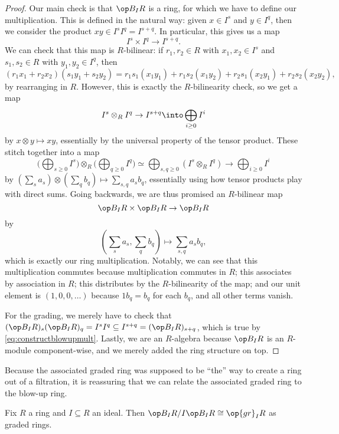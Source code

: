 \begin{proof}
	Our main check is that $\op B_IR$ is a ring, for which we have to define our multiplication. This is defined in the natural way: given $x\in I^s$ and $y\in I^q$, then we consider the product $xy\in I^sI^q=I^{s+q}$. In particular, this gives us a map
	\[I^s\times I^q\to I^{s+q}. \tag{$*$}\label{eq:constructblowupmult}\]
	We can check that this map is $R$-bilinear: if $r_1,r_2\in R$ with $x_1,x_2\in I^s$ and $s_1,s_2\in R$ with $y_1,y_2\in I^q$, then
	\[(r_1x_1+r_2x_2)(s_1y_1+s_2y_2)=r_1s_1(x_1y_1)+r_1s_2(x_1y_2)+r_2s_1(x_2y_1)+r_2s_2(x_2y_2),\]
	by rearranging in $R$. However, this is exactly the $R$-bilinearity check, so we get a map
	\[I^s\otimes_RI^q\to I^{s+q}\into\bigoplus_{i\ge0}I^i\]
	by $x\otimes y\mapsto xy$, essentially by the universal property of the tensor product. These stitch together into a map
	\[\Bigg(\bigoplus_{s\ge0}I^s\Bigg)\otimes_R\Bigg(\bigoplus_{q\ge0}I^q\Bigg)\simeq\bigoplus_{s,q\ge0}\left(I^s\otimes_R I^q\right)\to\bigoplus_{i\ge0}I^i\]
	by $\left(\sum_sa_s\right)\otimes\left(\sum_qb_q\right)\mapsto\sum_{s,q}a_sb_q$, essentially using how tensor products play with direct sums. Going backwards, we are thus promised an $R$-bilinear map
	\[\op B_IR\times\op B_IR\to\op B_IR\]
	by
	\[\left(\sum_sa_s,\sum_qb_q\right)\mapsto\sum_{s,q}a_sb_q,\]
	which is exactly our ring multiplication. Notably, we can see that this multiplication commutes because multiplication commutes in $R$; this associates by association in $R$; this distributes by the $R$-bilinearity of the map; and our unit element is $(1,0,0,\ldots)$ because $1b_q=b_q$ for each $b_q$, and all other terms vanish.

	For the grading, we merely have to check that $(\op B_IR)_s(\op B_IR)_q=I^sI^q\subseteq I^{s+q}=(\op B_IR)_{s+q}$, which is true by \autoref{eq:constructblowupmult}. Lastly, we are an $R$-algebra because $\op B_IR$ is an $R$-module component-wise, and we merely added the ring structure on top.
\end{proof}
Because the associated graded ring was supposed to be ``the'' way to create a ring out of a filtration, it is reassuring that we can relate the associated graded ring to the blow-up ring.
\begin{lemma}
	Fix $R$ a ring and $I\subseteq R$ an ideal. Then $\op B_IR/I\op B_IR\cong\op{gr}_IR$ as graded rings.
\end{lemma}
